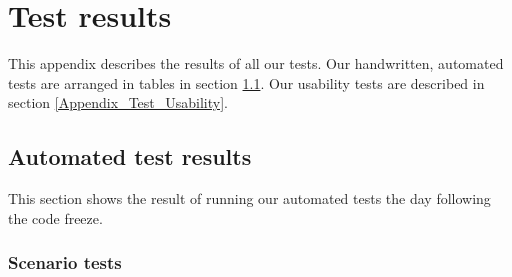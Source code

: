 \chapter{Test results}
\label{Appendix_Test}
This appendix describes the results of all our tests. Our handwritten, automated tests are arranged in tables in section \ref{Appendix_Test_Table}. Our usability tests are described in section \ref{Appendix_Test_Usability}.
\section{Automated test results}
\label{Appendix_Test_Table}
This section shows the result of running our automated tests the day following the code freeze.
\subsection{Scenario tests}
\label{Appendix_Test_Table_Scenario}
